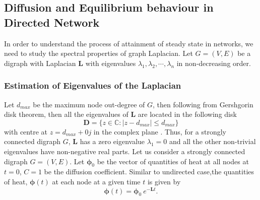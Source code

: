 \documentclass[10pt,a4paper]{article}
\theoremstyle{plain}
\theoremstyle{definition}
\begin{document}
        \subsection{Diffusion and Equilibrium behaviour in Directed Network}
        In order to understand the process of attainment of steady state in networks, we need to study the spectral properties of graph Laplacian. Let $G=(V,E)$ be a digraph with Laplacian $\mathbf{L}$ with eigenvalues $\lambda_1, \lambda_2, \cdots, \lambda_n$ in non-decreasing order. 
        \subsubsection{Estimation of Eigenvalues of the Laplacian}
        Let $d_{max}$ be the maximum node out-degree of $G$, then following from Gershgorin disk theorem, then all the eigenvalues of $\mathbf{L}$ are located in the following disk
        \begin{equation} 
        \mathbf{D} = \{ z \in \mathbb{C} : |z-d_{max}| \leq d_{max} \}
        \end{equation}
        with centre at $z = d_{max} +0j$ in the complex plane \citep{saber2003agreement}. Thus, for a strongly connected digraph $G$, $\mathbf{L}$ has a zero eigenvalue $\lambda_1=0$ and all the other non-trivial eigenvalues have non-negative real parts.
        Let us consider a strongly connected digraph $G=(V,E)$. Let $\boldsymbol{\phi}_0$ be the vector of quantities of heat at all nodes at $t=0$, $C=1$ be the diffusion coefficient. Similar to undirected case,the quantities of heat, $\boldsymbol{\phi}(t)$ at each node at a given time $t$ is given by
        \begin{equation}
        \boldsymbol{\phi}(t) = \boldsymbol{\phi}_0~e^{-\mathbf{L}t}.
        \end{equation}
        
\end{document}
